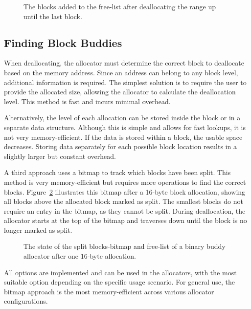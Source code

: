 \begin{figure}[h]
    \centering
    
    \caption{The blocks added to the free-list after deallocating the range up until the last block.}
    \label{fig:deallocrange}
\end{figure}

\subsection{Finding Block Buddies} \label{sec:findbuddiesexpl}
When deallocating, the allocator must determine the correct block to deallocate based on the memory address. Since an address can belong to any block level, additional information is required. The simplest solution is to require the user to provide the allocated size, allowing the allocator to calculate the deallocation level. This method is fast and incurs minimal overhead.

Alternatively, the level of each allocation can be stored inside the block or in a separate data structure. Although this is simple and allows for fast lookups, it is not very memory-efficient. If the data is stored within a block, the usable space decreases. Storing data separately for each possible block location results in a slightly larger but constant overhead.

A third approach uses a bitmap to track which blocks have been split. This method is very memory-efficient but requires more operations to find the correct blocks. Figure~\ref{fig:buddybmapsplit} illustrates this bitmap after a 16-byte block allocation, showing all blocks above the allocated block marked as split. The smallest blocks do not require an entry in the bitmap, as they cannot be split. During deallocation, the allocator starts at the top of the bitmap and traverses down until the block is no longer marked as split.

\begin{figure}[h]
    \centering
    
    \caption{The state of the split blocks-bitmap and free-list of a binary buddy allocator after one 16-byte allocation.}
    \label{fig:buddybmapsplit}
\end{figure}

All options are implemented and can be used in the allocators, with the most suitable option depending on the specific usage scenario. For general use, the bitmap approach is the most memory-efficient across various allocator configurations.


